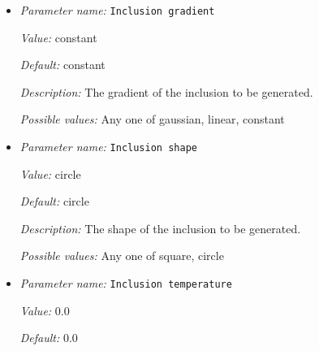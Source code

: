 \begin{itemize}
{\it Value:} 0.5


{\it Default:} 0.5


{\it Description:} The Z coordinate for the center of the shape. This is only necessary for three-dimensional fields.


{\it Possible values:} A floating point number $v$ such that $-\text{MAX\_DOUBLE} \leq v \leq \text{MAX\_DOUBLE}$
\item {\it Parameter name:} {\tt Inclusion gradient}
\label{parameters:Initial temperature model/Inclusion shape perturbation/Inclusion gradient}
\label{parameters:Initial_20temperature_20model/Inclusion_20shape_20perturbation/Inclusion_20gradient}


{\it Value:} constant


{\it Default:} constant


{\it Description:} The gradient of the inclusion to be generated.


{\it Possible values:} Any one of gaussian, linear, constant
\item {\it Parameter name:} {\tt Inclusion shape}
\label{parameters:Initial temperature model/Inclusion shape perturbation/Inclusion shape}
\label{parameters:Initial_20temperature_20model/Inclusion_20shape_20perturbation/Inclusion_20shape}


{\it Value:} circle


{\it Default:} circle


{\it Description:} The shape of the inclusion to be generated.


{\it Possible values:} Any one of square, circle
\item {\it Parameter name:} {\tt Inclusion temperature}
\label{parameters:Initial temperature model/Inclusion shape perturbation/Inclusion temperature}
\label{parameters:Initial_20temperature_20model/Inclusion_20shape_20perturbation/Inclusion_20temperature}


{\it Value:} 0.0


{\it Default:} 0.0



\end{itemize}
